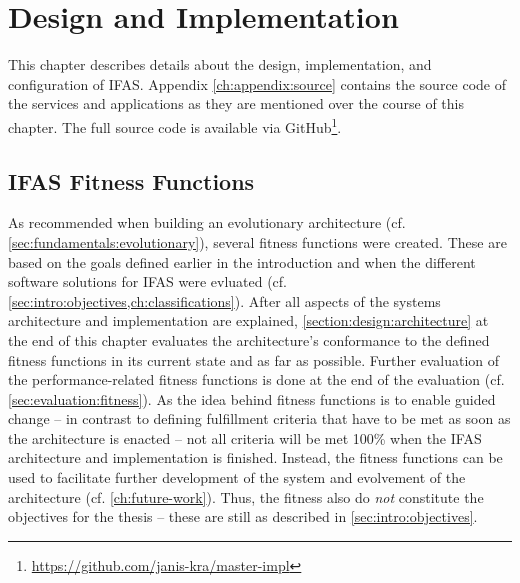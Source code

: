 %
\chapter{Design and Implementation}
\label{ch:implementation}

This chapter describes details about the design, implementation, and configuration of \acf{IFAS}.
Appendix \cref{ch:appendix:source} contains the source code of the services and applications as they are mentioned over the course of this chapter.
The full source code is available via GitHub\footnote{\url{https://github.com/janis-kra/master-impl}}.


\section{IFAS Fitness Functions}
\label{sec:implementation:fitness}

As recommended when building an evolutionary architecture (cf. \cref{sec:fundamentals:evolutionary}), several fitness functions were created.
These are based on the goals defined earlier in the introduction and when the different software solutions for \ac{IFAS} were evluated (cf. \cref{sec:intro:objectives,ch:classifications}).
After all aspects of the systems architecture and implementation are explained, \cref{section:design:architecture} at the end of this chapter evaluates the architecture's conformance to the defined fitness functions in its current state and as far as possible.
Further evaluation of the performance-related fitness functions is done at the end of the evaluation (cf. \cref{sec:evaluation:fitness}).
As the idea behind fitness functions is to enable guided change -- in contrast to defining fulfillment criteria that have to be met as soon as the architecture is enacted -- not all criteria will be met 100\% when the \ac{IFAS} architecture and implementation is finished.
Instead, the fitness functions can be used to facilitate further development of the system and evolvement of the architecture (cf. \cref{ch:future-work}).
Thus, the fitness also do \emph{not} constitute the objectives for the thesis -- these are still as described in \cref{sec:intro:objectives}.

